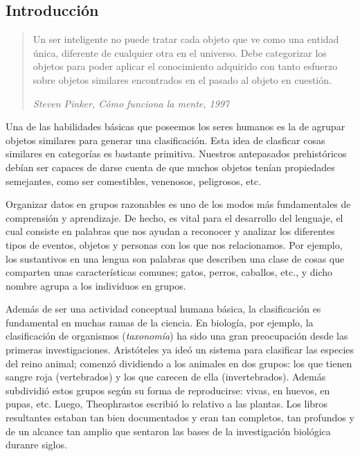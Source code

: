 
\subsection{Introducción}

\begin{quote}
    Un ser inteligente no puede tratar cada objeto que ve como una entidad única, diferente de cualquier otra en el universo. Debe categorizar los 
    objetos para poder aplicar el conocimiento adquirido con tanto esfuerzo sobre objetos similares encontrados en el pasado al objeto en cuestión.

\textit{Steven Pinker, Cómo funciona la mente, 1997}
\end{quote}

Una de las habilidades básicas que poseemos los seres humanos es la de agrupar objetos similares para generar una clasificación. Esta idea de 
clasficar cosas similares en categorías es bastante primitiva. Nuestros antepasados prehistóricos debían ser capaces de darse cuenta de que muchos
objetos tenían propiedades semejantes, como ser comestibles, venenosos, peligrosos, etc. \newline

Organizar datos en grupos razonables es uno de los modos más fundamentales de comprensión y aprendizaje. De hecho, es vital para el desarrollo del 
lenguaje, el cual consiste en palabras que nos ayudan a reconocer y analizar los diferentes tipos de eventos, objetos y personas con los que nos
relacionamos. Por ejemplo, los sustantivos en una lengua son palabras que describen una clase de cosas que comparten unas características comunes; 
gatos, perros, caballos, etc., y dicho nombre agrupa a los individuos en grupos. \newline

Además de ser una actividad conceptual humana básica, la clasificación es fundamental en muchas ramas de la ciencia. En biología, por ejemplo, la 
clasificación de organismos (\textit{taxonomía}) ha sido una gran preocupación desde las primeras investigaciones. Aristóteles ya ideó un sistema para clasificar las especies
del reino animal; comenzó dividiendo a los animales en dos grupos: los que tienen sangre roja (vertebrados) y los que carecen de ella (invertebrados). 
Además subdividió estos grupos según su forma de reproducirse: vivas, en huevos, en pupas, etc. Luego, Theophrastos escribió lo relativo a las plantas.
Los libros resultantes estaban tan bien documentados y eran tan completos, tan profundos y de un alcance tan amplio que sentaron las bases de la investigación
biológica duranre siglos. \newline


